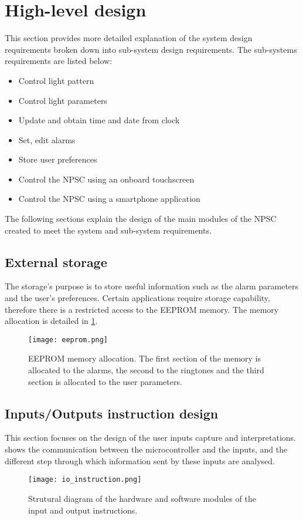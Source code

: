 \section{High-level design}\label{sub_requirements}
This section provides more detailed explanation of the system design requirements broken down into sub-system design requirements. The sub-systems requirements are listed below:
\begin{itemize}
\item Control light pattern
\item Control light parameters
\item Update and obtain time and date from clock
\item Set, edit alarms
\item Store user preferences
\item Control the NPSC using an onboard touchscreen
\item Control the NPSC using a smartphone application
\end{itemize}
The following sections explain the design of the main modules of the NPSC created to meet the system and sub-system requirements.


\subsection{External storage}
The storage's purpose is to store useful information such as the alarm parameters and the user's preferences. Certain applications require storage capability, therefore there is a restricted access to the EEPROM memory. The memory allocation is detailed in \cref{fig:eeprom}.
\begin{figure}[ht]
\centering
\texttt{[image: eeprom.png]}
\caption{EEPROM memory allocation. The first section of the memory is allocated to the alarms, the second to the ringtones and the third section is allocated to the user parameters.}
\label{fig:eeprom}
\end{figure}

\subsection{Inputs/Outputs instruction design}
This section focuses on the design of the user inputs capture and interpretations.  shows the communication between the microcontroller and the inputs, and the different step through which information sent by these inputs are analysed. 
\begin{figure}[ht]
\centering
\texttt{[image: io\_instruction.png]}
\caption{Strutural diagram of the hardware and software modules of the input and output instructions.}
\label{fig:io_instruction}
\end{figure}

